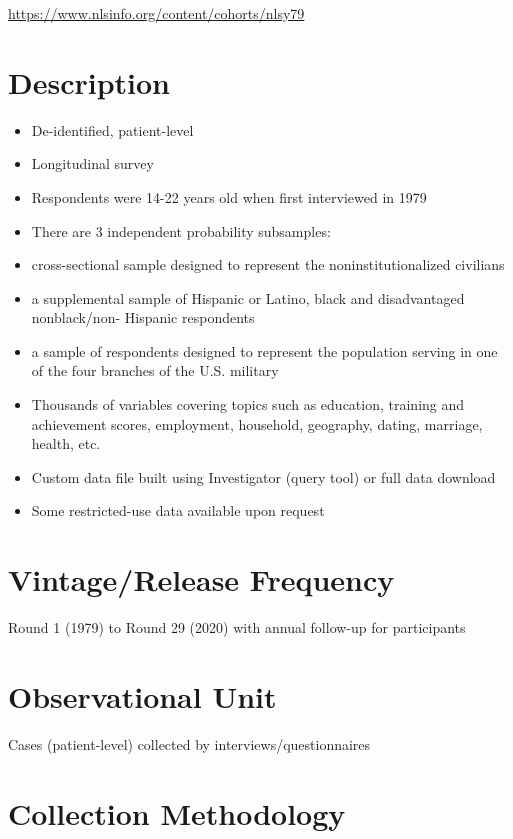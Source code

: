 \documentclass[
]{book}
\providecommand{\tightlist}{%
  \setlength{\itemsep}{0pt}\setlength{\parskip}{0pt}}
\begin{document}
\url{https://www.nlsinfo.org/content/cohorts/nlsy79}

\hypertarget{description-58}{%
\section{Description}\label{description-58}}

\begin{itemize}
\tightlist
\item
  De-identified, patient-level
\item
  Longitudinal survey
\item
  Respondents were 14-22 years old when first interviewed in 1979
\item
  There are 3 independent probability subsamples:
\item
  cross-sectional sample designed to represent the noninstitutionalized civilians
\item
  a supplemental sample of Hispanic or Latino, black and disadvantaged nonblack/non- Hispanic respondents
\item
  a sample of respondents designed to represent the population serving in one of the four branches of the U.S. military
\item
  Thousands of variables covering topics such as education, training and achievement scores, employment, household, geography, dating, marriage, health, etc.
\item
  Custom data file built using Investigator (query tool) or full data download
\item
  Some restricted-use data available upon request
\end{itemize}

\hypertarget{vintagerelease-frequency-58}{%
\section{Vintage/Release Frequency}\label{vintagerelease-frequency-58}}

Round 1 (1979) to Round 29 (2020) with annual follow-up for participants

\hypertarget{observational-unit-58}{%
\section{Observational Unit}\label{observational-unit-58}}

Cases (patient-level) collected by interviews/questionnaires

\hypertarget{collection-methodology-58}{%
\section{Collection Methodology}\label{collection-methodology-58}}
\end{document}
